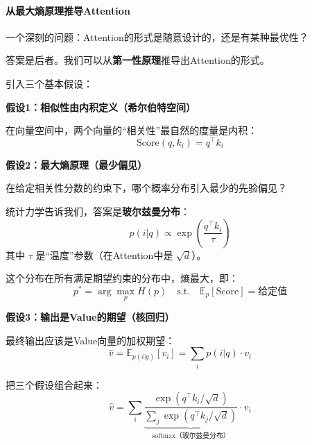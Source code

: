 \paragraph{从最大熵原理推导Attention}

一个深刻的问题：Attention的形式是随意设计的，还是有某种最优性？

答案是后者。我们可以从\textbf{第一性原理}推导出Attention的形式。

\begin{keyidea}[从第一性原理推导Attention]
引入三个基本假设：

\textbf{假设1：相似性由内积定义（希尔伯特空间）}

在向量空间中，两个向量的“相关性”最自然的度量是内积：
\begin{equation}
    \text{Score}(q, k_i) = q^\top k_i
\end{equation}

\textbf{假设2：最大熵原理（最少偏见）}

在给定相关性分数的约束下，哪个概率分布引入最少的先验偏见？

统计力学告诉我们，答案是\textbf{玻尔兹曼分布}：
\begin{equation}
    p(i|q) \propto \exp\left(\frac{q^\top k_i}{\tau}\right)
\end{equation}
其中 $\tau$ 是“温度”参数（在Attention中是 $\sqrt{d}$）。

这个分布在所有满足期望约束的分布中，熵最大，即：
\begin{equation}
    p^* = \arg\max_p H(p) \quad \text{s.t.} \quad \mathbb{E}_p[\text{Score}] = \text{给定值}
\end{equation}

\textbf{假设3：输出是Value的期望（核回归）}

最终输出应该是Value向量的加权期望：
\begin{equation}
    \hat{v} = \mathbb{E}_{p(i|q)}[v_i] = \sum_i p(i|q) \cdot v_i
\end{equation}
\end{keyidea}

把三个假设组合起来：
\begin{equation}
    \hat{v} = \sum_i \underbrace{\frac{\exp(q^\top k_i / \sqrt{d})}{\sum_j \exp(q^\top k_j / \sqrt{d})}}_{\text{softmax（玻尔兹曼分布）}} \cdot v_i
\end{equation}


